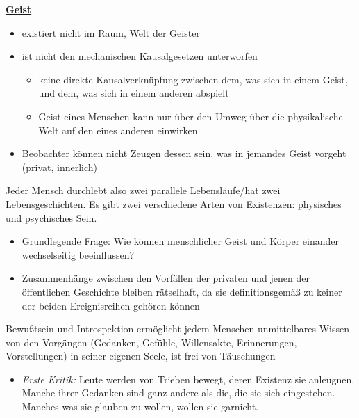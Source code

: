 \documentclass[landscape, twocolumn]{scrartcl}
\begin{document}
\begin{center} \underline{\textbf{Geist}} \end{center}
\begin{itemize}
    \item
        existiert nicht im Raum, Welt der Geister
    \item
        ist nicht den mechanischen Kausalgesetzen unterworfen
        \begin{itemize}
            \item
                keine direkte Kausalverknüpfung zwischen dem, was sich in einem Geist, und dem, was sich in einem anderen abspielt
            \item
                Geist eines Menschen kann nur über den Umweg über die physikalische Welt auf den eines anderen einwirken
        \end{itemize}
    \item
        Beobachter können nicht Zeugen dessen sein, was in jemandes Geist vorgeht (privat, innerlich)
\end{itemize}
Jeder Mensch durchlebt also zwei parallele Lebensläufe/hat zwei Lebensgeschichten. Es gibt zwei verschiedene Arten von Existenzen: physisches und psychisches Sein.\begin{itemize}
    \item
        Grundlegende Frage: Wie können menschlicher Geist und Körper einander wechselseitig beeinflussen?
    \item
        Zusammenhänge zwischen den Vorfällen der privaten und jenen der öffentlichen Geschichte bleiben rätselhaft, da sie definitionsgemäß zu keiner der beiden Ereignisreihen gehören können
\end{itemize}

\smallskip

\noindent Bewußtsein und Introspektion ermöglicht jedem Menschen unmittelbares Wissen von den Vorgängen (Gedanken, Gefühle, Willensakte, Erinnerungen, Vorstellungen) in seiner eigenen Seele, ist frei von Täuschungen
\begin{itemize}
    \item
        \textit{Erste Kritik:} Leute werden von Trieben bewegt, deren Existenz sie anleugnen. Manche ihrer Gedanken sind ganz andere als die, die sie sich eingestehen. Manches was sie glauben zu wollen, wollen sie garnicht.

\end{itemize}
\end{document}
